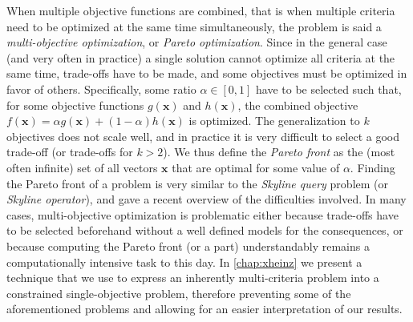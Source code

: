 	When multiple objective functions are combined, that is when multiple criteria need to be optimized at the same time simultaneously, the problem is said a \emph{multi-objective optimization}, or \emph{Pareto optimization}.
	Since in the general case (and very often in practice) a single solution cannot optimize all criteria at the same time, trade-offs have to be made, and some objectives must be optimized in favor of others.
	Specifically, some ratio $\alpha \in [0, 1]$ have to be selected such that, for some objective functions $g(\mathbf{x})$ and $h(\mathbf{x})$, the combined objective $f(\mathbf{x}) = \alpha{}g(\mathbf{x}) + (1 - \alpha{})h(\mathbf{x})$ is optimized.
	The generalization to $k$ objectives does not scale well, and in practice it is very difficult to select a good trade-off (or trade-offs for $k > 2$).
	We thus define the \emph{Pareto front} as the (most often infinite) set of all vectors $\mathbf{x}$ that are optimal for some value of $\alpha$.
	Finding the Pareto front of a problem is very similar to the \emph{Skyline query} problem (or \emph{Skyline operator}), and \textcite{rekatsinas2015finding} gave a recent overview of the difficulties involved.
	In many cases, multi-objective optimization is problematic either because trade-offs have to be selected beforehand without a well defined models for the consequences, or because computing the Pareto front (or a part) understandably remains a computationally intensive task to this day.
	In \cref{chap:xheinz} we present a technique that we use to express an inherently multi-criteria problem into a constrained single-objective problem, therefore preventing some of the aforementioned problems and allowing for an easier interpretation of our results.

